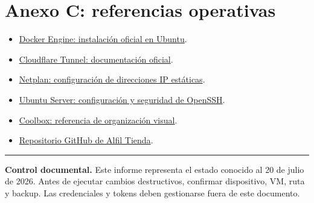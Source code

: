 \documentclass[11pt,a4paper]{article}
\begin{document}
\section{Anexo C: referencias operativas}

\begin{itemize}
  \item \href{https://docs.docker.com/engine/install/ubuntu/}{Docker Engine: instalación oficial en Ubuntu}.
  \item \href{https://developers.cloudflare.com/tunnel/}{Cloudflare Tunnel: documentación oficial}.
  \item \href{https://netplan.readthedocs.io/en/stable/using-static-ip-addresses/}{Netplan: configuración de direcciones IP estáticas}.
  \item \href{https://documentation.ubuntu.com/server/how-to/security/openssh-server/}{Ubuntu Server: configuración y seguridad de OpenSSH}.
  \item \href{https://www.coolbox.pe/}{Coolbox: referencia de organización visual}.
  \item \href{https://github.com/sebaswaton/alfil-tienda}{Repositorio GitHub de Alfil Tienda}.
\end{itemize}

\medskip
\hrule
\smallskip
\textbf{Control documental.} Este informe representa el estado conocido al 20 de julio de 2026. Antes de ejecutar cambios destructivos, confirmar dispositivo, VM, ruta y backup. Las credenciales y tokens deben gestionarse fuera de este documento.
\end{document}
